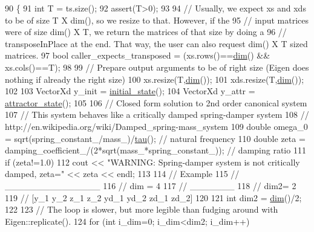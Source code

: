 \begin{DoxyCode}
90 \{
91   \textcolor{keywordtype}{int} T = ts.size();
92   assert(T>0);
93 
94   \textcolor{comment}{// Usually, we expect xs and xds to be of size T X dim(), so we resize to that. However, if the}
95   \textcolor{comment}{// input matrices were of size dim() X T, we return the matrices of that size by doing a }
96   \textcolor{comment}{// transposeInPlace at the end. That way, the user can also request dim() X T sized matrices.}
97   \textcolor{keywordtype}{bool} caller\_expects\_transposed = (xs.rows()==\hyperlink{group__DynamicalSystems_ga6f628f7f4ed9d77bf69f5b8560b98f18}{dim}() && xs.cols()==T);
98 
99   \textcolor{comment}{// Prepare output arguments to be of right size (Eigen does nothing if already the right size)}
100   xs.resize(T,\hyperlink{group__DynamicalSystems_ga6f628f7f4ed9d77bf69f5b8560b98f18}{dim}());
101   xds.resize(T,\hyperlink{group__DynamicalSystems_ga6f628f7f4ed9d77bf69f5b8560b98f18}{dim}());
102 
103   VectorXd y\_init = \hyperlink{group__DynamicalSystems_ga4c7f24e7deec1629548a075015bdc693}{initial\_state}();
104   VectorXd y\_attr = \hyperlink{group__DynamicalSystems_gaebe3c462bc4a725cb17bcc3d13285f13}{attractor\_state}();
105   
106   \textcolor{comment}{// Closed form solution to 2nd order canonical system}
107   \textcolor{comment}{// This system behaves like a critically damped spring-damper system}
108   \textcolor{comment}{// http://en.wikipedia.org/wiki/Damped\_spring-mass\_system}
109   \textcolor{keywordtype}{double} omega\_0 = sqrt(spring\_constant\_/mass\_)/\hyperlink{group__DynamicalSystems_ga50eec7ad4c9664b5809ace45b22200d5}{tau}(); \textcolor{comment}{// natural frequency}
110   \textcolor{keywordtype}{double} zeta    = damping\_coefficient\_/(2*sqrt(mass\_*spring\_constant\_)); \textcolor{comment}{// damping ratio}
111   \textcolor{keywordflow}{if} (zeta!=1.0)
112     cout << \textcolor{stringliteral}{"WARNING: Spring-damper system is not critically damped, zeta="} << zeta << endl;
113       
114   \textcolor{comment}{// Example}
115   \textcolor{comment}{//  \_\_\_\_\_\_\_\_\_\_\_\_\_\_\_}
116   \textcolor{comment}{//    dim = 4}
117   \textcolor{comment}{//  \_\_\_\_\_\_\_}
118   \textcolor{comment}{//  dim2= 2}
119   \textcolor{comment}{// [y\_1 y\_2 z\_1 z\_2 yd\_1 yd\_2 zd\_1 zd\_2]}
120   
121   \textcolor{keywordtype}{int} dim2 = \hyperlink{group__DynamicalSystems_ga6f628f7f4ed9d77bf69f5b8560b98f18}{dim}()/2;
122 
123   \textcolor{comment}{// The loop is slower, but more legible than fudging around with Eigen::replicate().}
124   \textcolor{keywordflow}{for} (\textcolor{keywordtype}{int} i\_dim=0; i\_dim<dim2; i\_dim++)

\end{DoxyCode}
